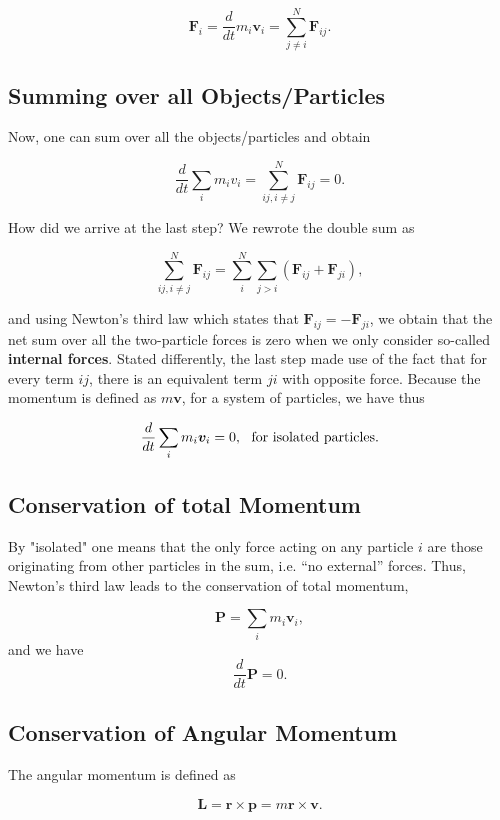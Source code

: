 \documentclass[%
oneside,                 %
final,                   %
10pt]{article}
\begin{document}
\begin{equation}
\bm{F}_i=\frac{d}{dt}m_i\bm{v}_i=\sum_{j\ne i}^N\bm{F}_{ij}.
\end{equation}

\subsection*{Summing over all Objects/Particles}

Now, one can sum over all the objects/particles and obtain

\[
\frac{d}{dt}\sum_i m_iv_i=\sum_{ij, i\ne j}^N\bm{F}_{ij}=0.
\]

How did we arrive at the last step?  We rewrote the double sum as

\[
\sum_{ij, i\ne j}^N\bm{F}_{ij}=\sum_i^N\sum_{j>i}\left(\bm{F}_{ij}+\bm{F}_{ji}\right),
\]

and using Newton's third law which states that
$\bm{F}_{ij}=-\bm{F}_{ji}$, we obtain that the net sum over all  the two-particle
forces is zero when we only consider so-called \textbf{internal forces}.
Stated differently, the last step made use of the fact that for every
term $ij$, there is an equivalent term $ji$ with opposite
force. Because the momentum is defined as $m\bm{v}$, for a system of
particles, we have thus

\begin{equation}
\frac{d}{dt}\sum_im_i\bm{v}_i=0,~~{\rm for~isolated~particles}.
\end{equation}

\subsection*{Conservation of total Momentum}

By "isolated" one means that the only force acting on any particle $i$
are those originating from other particles in the sum, i.e. ``no
external'' forces. Thus, Newton's third law leads to the conservation
of total momentum,

\[
\bm{P}=\sum_i m_i\bm{v}_i,
\]
and we have
\[
\frac{d}{dt}\bm{P}=0.
\]

\subsection*{Conservation of Angular Momentum}

The angular momentum is defined as

\begin{equation}
\bm{L}=\bm{r}\times\bm{p}=m\bm{r}\times\bm{v}.
\end{equation}
\end{document}

